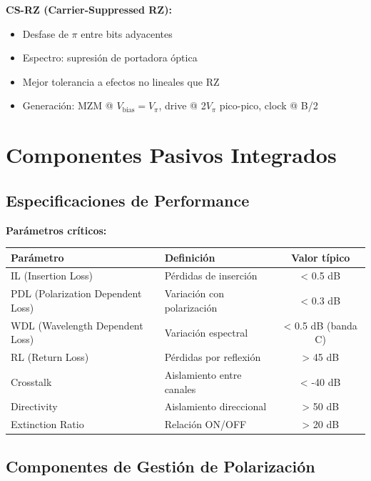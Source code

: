 \documentclass[11pt,a4paper]{article}
\begin{document}
\textbf{CS-RZ (Carrier-Suppressed RZ):}
\begin{itemize}
    \item Desfase de $\pi$ entre bits adyacentes
    \item Espectro: supresión de portadora óptica
    \item Mejor tolerancia a efectos no lineales que RZ
    \item Generación: MZM @ $V_{\text{bias}} = V_\pi$, drive @ 2$V_\pi$ pico-pico, clock @ B/2
\end{itemize}

\section{Componentes Pasivos Integrados}

\subsection{Especificaciones de Performance}

\textbf{Parámetros críticos:}

\begin{table}[h]
\centering\small
\begin{tabular}{llc}
\hline
\textbf{Parámetro} & \textbf{Definición} & \textbf{Valor típico} \\
\hline
IL (Insertion Loss) & Pérdidas de inserción & < 0.5 dB \\
PDL (Polarization Dependent Loss) & Variación con polarización & < 0.3 dB \\
WDL (Wavelength Dependent Loss) & Variación espectral & < 0.5 dB (banda C) \\
RL (Return Loss) & Pérdidas por reflexión & > 45 dB \\
Crosstalk & Aislamiento entre canales & < -40 dB \\
Directivity & Aislamiento direccional & > 50 dB \\
Extinction Ratio & Relación ON/OFF & > 20 dB \\
\hline
\end{tabular}
\end{table}

\subsection{Componentes de Gestión de Polarización}
\end{document}
